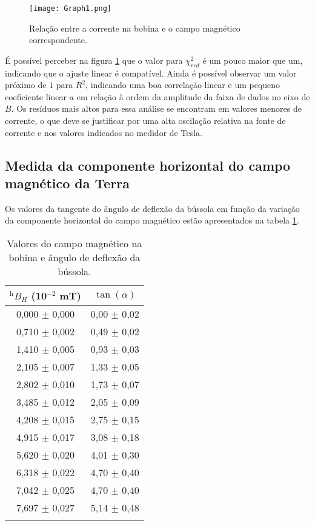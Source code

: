 \documentclass[reprint,amsmath,amssymb,aps]{revtex4-2}
\begin{document}
\begin{figure}[H]
    \centering
    \texttt{[image: Graph1.png]}
    \caption{Relação entre a corrente na bobina e o campo magnético correspondente.}
    \label{fig:calibracao}
\end{figure}

É possível perceber na figura \ref{fig:calibracao} que o valor para $\chi_{red}^2$ é um pouco maior que um, indicando que o ajuste linear é compatível. Ainda é possível observar um valor próximo de $1$ para $R^2$, indicando uma boa correlação linear e um pequeno coeficiente linear $a$ em relação à ordem da amplitude da faixa de dados no eixo de $B$. Os resíduos mais altos para essa análise se encontram em valores menores de corrente, o que deve se justificar por uma alta oscilação relativa na fonte de corrente e nos valores indicados no medidor de Tesla.

\subsection{Medida da componente horizontal do campo magnético da Terra}

Os valores da tangente do ângulo de deflexão da bússola em função da variação da componente horizontal do campo magnético estão apresentados na tabela \ref{tab:medida}.

\begin{table}[H]
\centering
\caption{\label{tab:medida} Valores do campo magnético na bobina e ângulo de deflexão da bússola.}
\begin{tabular}{cc}
\hhline{==}
$^\text{h}B_H$ (10$^{-2}$ mT) & $\tan(\alpha)$ \\ \hline
0,000  $\pm$ 0,000   & 0,00   $\pm$ 0,02    \\
0,710  $\pm$ 0,002   & 0,49   $\pm$ 0,02    \\
1,410  $\pm$ 0,005   & 0,93   $\pm$ 0,03    \\
2,105  $\pm$ 0,007   & 1,33   $\pm$ 0,05    \\
2,802  $\pm$ 0,010   & 1,73   $\pm$ 0,07    \\
3,485  $\pm$ 0,012   & 2,05   $\pm$ 0,09    \\
4,208  $\pm$ 0,015   & 2,75   $\pm$ 0,15    \\
4,915  $\pm$ 0,017   & 3,08   $\pm$ 0,18    \\
5,620  $\pm$ 0,020   & 4,01   $\pm$ 0,30    \\
6,318  $\pm$ 0,022   & 4,70   $\pm$ 0,40    \\
7,042  $\pm$ 0,025   & 4,70   $\pm$ 0,40    \\
7,697  $\pm$ 0,027   & 5,14   $\pm$ 0,48    \\
\hhline{==}
\end{tabular}
\end{table}
\end{document}
